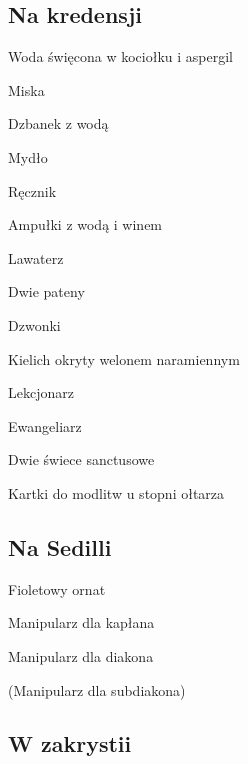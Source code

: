 \begin{paracol}{2}
	\subsection{Na kredensji}

	\begin{itemize*}
		\item Woda święcona w kociołku i aspergil
		\item Miska
		\item Dzbanek z wodą
		\item Mydło
		\item Ręcznik
		\item Ampułki z wodą i winem
		\item Lawaterz
		\item Dwie pateny
		\item Dzwonki
		\item Kielich okryty welonem naramiennym
		\item Lekcjonarz
		\item Ewangeliarz
		\item Dwie świece sanctusowe
		\item Kartki do modlitw u stopni ołtarza
	\end{itemize*}

	\subsection{Na Sedilli}

	\begin{itemize*}
		\item {\color{violet} Fioletowy ornat}
		\item {\color{violet} Manipularz dla kapłana}
		\item {\color{violet} Manipularz dla diakona}
		\item {\color{violet} (Manipularz dla subdiakona)}
	\end{itemize*}

	\subsection{W zakrystii}


\end{paracol}
